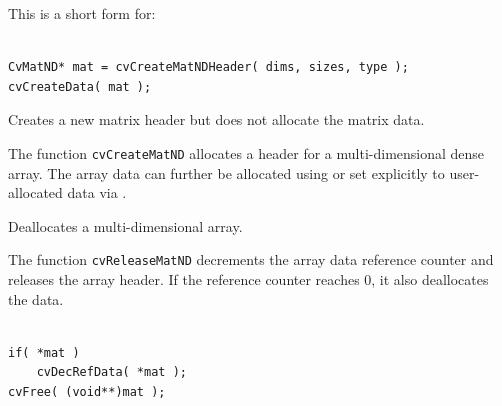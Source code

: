 This is a short form for:

\begin{lstlisting}

CvMatND* mat = cvCreateMatNDHeader( dims, sizes, type );
cvCreateData( mat );

\end{lstlisting}

\label{CreateMatNDHeader}

Creates a new matrix header but does not allocate the matrix data.


\begin{description}
\end{description}

The function \texttt{cvCreateMatND} allocates a header for a multi-dimensional dense array. The array data can further be allocated using  or set explicitly to user-allocated data via .

\label{ReleaseMatND}

Deallocates a multi-dimensional array.


\begin{description}
\end{description}

The function \texttt{cvReleaseMatND} decrements the array data reference counter and releases the array header. If the reference counter reaches 0, it also deallocates the data.

\begin{lstlisting}

if( *mat )
    cvDecRefData( *mat );
cvFree( (void**)mat );

\end{lstlisting}

\label{InitMatNDHeader}


